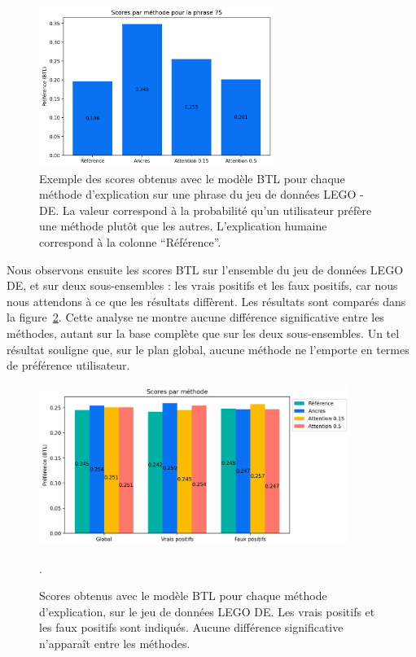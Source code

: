 \begin{figure}[h!tpb]
  \setlength{\belowcaptionskip}{-20pt}
\begin{center}
  \includegraphics[width=0.68\textwidth]{S3-Comparaison_de_methodes/figures/btl_plot.png}
  \caption{Exemple des scores obtenus avec le modèle BTL pour chaque méthode d'explication sur une phrase du jeu de données LEGO - DE. La valeur correspond à la probabilité qu'un utilisateur préfère une méthode plutôt que les autres. L'explication humaine correspond à la colonne ``Référence''. }\label{fig:btl_plot}
 \end{center}
\end{figure}

Nous observons ensuite les scores BTL sur l'ensemble du jeu de données LEGO DE, et sur deux sous-ensembles : les vrais positifs et les faux positifs, car nous nous attendons à ce que les résultats diffèrent. Les résultats sont comparés dans la figure~\ref{fig:btl_plot_global}. Cette analyse ne montre aucune différence significative entre les méthodes, autant sur la base complète que sur les deux sous-ensembles. Un tel résultat souligne que, sur le plan global, aucune méthode ne l'emporte en termes de préférence utilisateur.

\begin{figure}[h!tpb]
  \setlength{\belowcaptionskip}{-20pt}
 \begin{center}
  \includegraphics[width=0.9\textwidth]{S3-Comparaison_de_methodes/figures/btl_plot_global_tp_fp.png}
  \caption{Scores obtenus avec le modèle BTL pour chaque méthode d'explication, sur le jeu de données LEGO DE. Les vrais positifs et les faux positifs sont indiqués. Aucune différence significative n'apparaît entre les méthodes.}\label{fig:btl_plot_global}.
 \end{center}
\end{figure}

